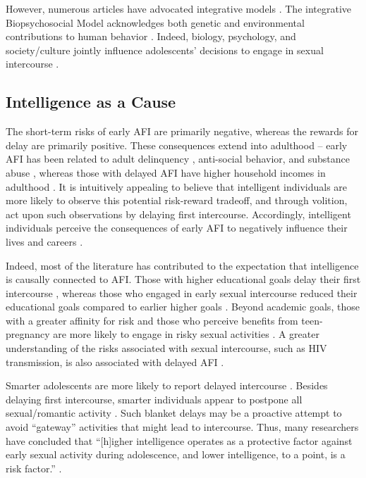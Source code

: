 However, numerous articles have advocated integrative models \citep[See][]{harden2008rethinking,harden2014genetic,udry1995sociology}. The integrative Biopsychosocial Model acknowledges both genetic and environmental contributions to human behavior \citep{Engel1977,petersen1987nature,rodgers1999nature}. Indeed, biology, psychology, and society/culture jointly influence adolescents' decisions to engage in sexual intercourse \citep{Meschke2000,zimmer2008ten}.
%
\subsection{Intelligence as a Cause}
The short-term risks of early AFI are primarily negative, whereas the rewards for delay are primarily positive. These consequences extend into adulthood -- early AFI has been related to adult delinquency \citep{harden2008rethinking}, anti-social behavior, and substance abuse \citep{boislard2011individual}, whereas those with delayed AFI have higher household incomes in adulthood \citep{Harden2012}. It is intuitively appealing to believe that intelligent individuals are more likely to observe this potential risk-reward tradeoff, and through volition, act upon such observations by delaying first intercourse. Accordingly, intelligent individuals perceive the consequences of early AFI to negatively influence their lives and careers \citep{halpern2000smart,harden2011don}.

Indeed, most of the literature has contributed to the expectation that intelligence is causally connected to AFI. Those with higher educational goals delay their first intercourse \citep{boislard2011individual,schvaneveldt2001academic}, whereas those who engaged in early sexual intercourse reduced their educational goals compared to earlier higher goals \citep{schvaneveldt2001academic}. Beyond academic goals, those with a greater affinity for risk and those who perceive benefits from teen-pregnancy are more likely to engage in risky sexual activities \citep{raffaelli2003sexual}. A greater understanding of the risks associated with sexual intercourse, such as HIV transmission, is also associated with delayed AFI \citep{mathews2009predictors}.

Smarter adolescents are more likely to report delayed intercourse \citep{halpern2000smart,mott1983early,Paul2000,Woodward2001}. Besides delaying first intercourse, smarter individuals appear to postpone all sexual/romantic activity \citep{halpern2000smart}. Such blanket delays may be a proactive attempt to avoid ``gateway'' activities that might lead to intercourse. Thus, many researchers have concluded that ``[h]igher intelligence operates as a protective factor against early sexual activity during adolescence, and lower intelligence, to a point, is a risk factor.'' \citep[][p. 213]{halpern2000smart}.

